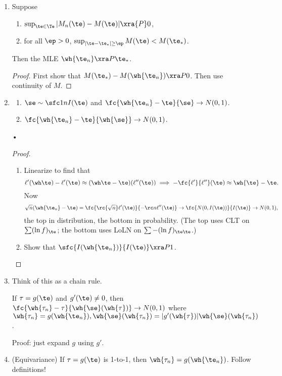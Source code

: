 \begin{enumerate}
\item
\begin{thm}
Suppose 
\begin{enumerate}
\item
$\sup_{\te\in \Te}|M_n(\te)-M(\te)|\xra{P}0$,
\item
for all $\ep>0$, $\sup_{|\te-\te_*|\ge\ep} M(\te)<M(\te_*)$.
\end{enumerate}
Then the MLE $\wh{\te_n}\xra P\te_*$.
\end{thm}
\begin{proof}
First show that $M(\te_*)-M(\wh{\te_n})\xra P0$. Then use continuity of $M$.
\end{proof}
\item
\begin{thm}
\begin{enumerate}
\item
$\se\sim \sfc1{nI(\te)}$ and $\fc{\wh{\te_n}-\te}{\se}\to N(0,1)$.
\item {}
$\fc{\wh{\te_n}-\te}{\wh{\se}}\to N(0,1)$.
\end{enumerate}•
\end{thm}
\begin{proof}
\begin{enumerate}
\item
Linearize to find that
\[
\ell'(\wh \te)-\ell'(\te)\approx (\wh \te-\te)(\ell''(\te))\implies -\fc{\ell'}{\ell''}(\te)\approx \wh{\te}-\te.
\]
Now
\[
\sqrt n(\wh{\te_n}-\te)=\fc{\rc{\sqrt n}\ell'(\te)}{-\rc n\ell''(\te)}\to \fc{N(0,I(\te))}{I(\te)}\to N(0,1),
\]
the top in distribution, the bottom in probability. (The top uses CLT on $\sum (\ln f)_\te$; the bottom uses LoLN on $\sum -(\ln f)_{\te\te}$.)
\item
Show that $\sfc{I(\wh{\te_n})}{I(\te)}\xra P 1$.
\end{enumerate}
\end{proof}
\item Think of this as a chain rule.
\begin{thm}
If $\tau=g(\te)$ and $g'(\te)\ne 0$, then $\fc{\wh{\tau_n}-\tau}{\wh{\se}(\wh{\tau})}\to N(0,1)$ where $\wh{\tau_n}=g(\wh{\te_n}),\wh{\se}(\wh{\tau_n})=|g'(\wh{\tau})|\wh{\se}(\wh{\tau_n})$.
\end{thm}
Proof: just expand $g$ using $g'$.
\item (Equivariance) If $\tau=g(\te)$ is 1-to-1, then $\wh{\tau_n}=g(\wh{\te_n})$. Follow definitions!
\end{enumerate}

